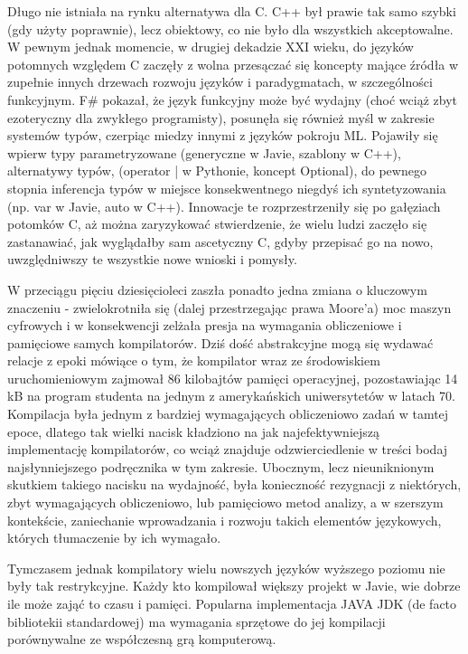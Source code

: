 Długo nie istniała na rynku alternatywa dla C. C++ był prawie tak samo szybki (gdy użyty poprawnie), lecz obiektowy, co nie było dla wszystkich akceptowalne. W pewnym jednak momencie, w drugiej dekadzie XXI wieku, do języków potomnych względem C zaczęły z wolna przesączać się koncepty mające źródła w zupełnie innych drzewach rozwoju języków i paradygmatach, w szczególności funkcyjnym. F\# pokazał, że język funkcyjny może być wydajny (choć wciąż zbyt ezoteryczny dla zwykłego programisty), posunęła się również myśl w zakresie systemów typów, czerpiąc miedzy innymi z języków pokroju ML. Pojawiły się wpierw typy parametryzowane (generyczne w Javie, szablony w C++), alternatywy typów, (operator | w Pythonie, koncept Optional), do pewnego stopnia inferencja typów w miejsce konsekwentnego niegdyś ich syntetyzowania (np. var w Javie, auto w C++). Innowacje te rozprzestrzeniły się po gałęziach potomków C, aż można zaryzykować stwierdzenie, że wielu ludzi zaczęło się zastanawiać, jak wyglądałby sam ascetyczny C, gdyby przepisać go na nowo, uwzględniwszy te wszystkie nowe wnioski i pomysły.

W przeciągu pięciu dziesięcioleci zaszła ponadto jedna zmiana o kluczowym znaczeniu - zwielokrotniła się (dalej przestrzegając prawa Moore'a) moc maszyn cyfrowych i w konsekwencji zelżała presja na wymagania obliczeniowe i pamięciowe samych kompilatorów. Dziś dość abstrakcyjne mogą się wydawać relacje z epoki mówiące o tym, że kompilator wraz ze środowiskiem uruchomieniowym zajmował 86 kilobajtów pamięci operacyjnej, pozostawiając 14 kB na program studenta na jednym z amerykańskich uniwersytetów w latach 70. Kompilacja była jednym z bardziej wymagających obliczeniowo zadań w tamtej epoce, dlatego tak wielki nacisk kładziono na jak najefektywniejszą implementację kompilatorów, co wciąż znajduje odzwierciedlenie w treści bodaj najsłynniejszego podręcznika w tym zakresie\cite{DRAGON_BOOK}.
Ubocznym, lecz nieuniknionym skutkiem takiego nacisku na wydajność, była konieczność rezygnacji z niektórych, zbyt wymagających obliczeniowo, lub pamięciowo metod analizy, a w szerszym kontekście, zaniechanie wprowadzania i rozwoju takich elementów językowych, których tłumaczenie by ich wymagało.

Tymczasem jednak kompilatory wielu nowszych języków wyższego poziomu nie były tak restrykcyjne. Każdy kto kompilował większy projekt w Javie, wie dobrze ile może zająć to czasu i pamięci. Popularna implementacja JAVA JDK (de facto bibliotekii standardowej) ma wymagania sprzętowe do jej kompilacji porównywalne ze współczesną grą komputerową.\cite{jdk_build_requirements}

